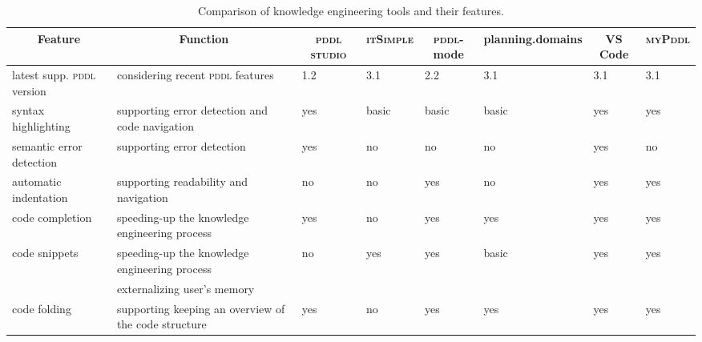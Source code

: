 \documentclass[runningheads]{llncs}
\newcommand{\tableheadline}[1]{\multicolumn{1}{c}{#1}}
\newcommand{\mypddl}{\textsc{myPddl}\xspace}
\newcommand{\pddlstudio}{\textsc{pddl studio}\xspace}
\newcommand{\itsimple}{\textsc{itSimple}\xspace}
\newcommand{\pddlmode}{\textsc{pddl}-mode\xspace}
\newcommand{\pddl}{\textsc{pddl}\xspace}
\begin{document}
\begin{table}
\centering
\scriptsize
\caption[Comparison of knowledge engineeringtools]{\label{tool-comp}Comparison of knowledge engineering tools and their features.}
\begin{tabularx}{\textwidth}{lX|llllll}
  \tableheadline{Feature}             & \tableheadline{Function}                              & \tableheadline{\pddlstudio} & \tableheadline{\itsimple} & \tableheadline{\pddlmode} & \tableheadline{planning.domains} & \tableheadline{VS Code} & \tableheadline{\mypddl} \\
  \hline
  latest supp. \pddl version      & considering recent \pddl features                     & 1.2                         & 3.1                       & 2.2                           &   3.1    &  3.1    & 3.1       \\
  syntax highlighting                 & supporting error detection and code navigation        & yes                         & basic                     & basic                         &   basic  & yes     & yes       \\
  semantic error detection            & supporting error detection                            & yes                         & no                        & no                            &   no     & yes     & no        \\
  automatic indentation               & supporting readability and navigation                 & no                          & no                        & yes                           &   no     & yes     & yes       \\
  code completion                     & speeding-up the knowledge engineering process         & yes                         & no                        & yes                           &   yes    & yes     & yes       \\
  code snippets                       & speeding-up the knowledge engineering process         & no                          & yes                       & yes                           &   basic  & yes     & yes       \\
                                      & externalizing user's memory                           &                             &                           &                               &          &         &           \\
  code folding                        & supporting keeping an overview of the code structure  & yes                         & no                        & yes                           &   yes    & yes     & yes       \\

\end{tabularx}
\end{table}
\end{document}
